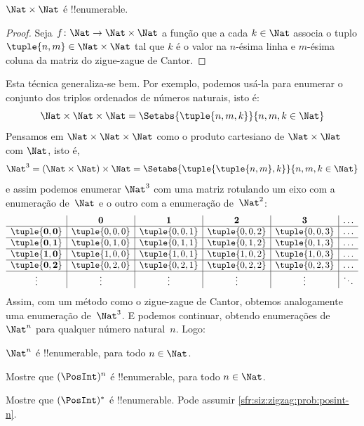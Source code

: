 \documentclass[../../../include/open-logic-section]{subfiles}
\begin{document}
\begin{prop}
$\Nat \times \Nat$ é !!{enumerable}.
\end{prop}

\begin{proof}
Seja $f \colon \Nat \to \Nat\times\Nat$ a função que a cada $k \in \Nat$ associa o
tuplo $\tuple{n,m} \in \Nat \times \Nat$ tal que $k$ é o valor na $n$-ésima
linha e $m$-ésima coluna da matriz do zigue-zague de Cantor.
\end{proof}

\begin{explain}
Esta técnica generaliza-se bem. Por exemplo, podemos usá-la para enumerar o
conjunto dos triplos ordenados de números naturais, isto é:
\[
\Nat \times \Nat \times \Nat = \Setabs{\tuple{n,m,k}}{n,m,k \in \Nat}
\]
Pensamos em $\Nat \times \Nat \times \Nat$ como o produto cartesiano de $\Nat
\times \Nat$ com $\Nat$, isto é,
\[
\Nat^3 = (\Nat \times \Nat) \times \Nat =
\Setabs{\tuple{\tuple{n,m},k}}{n, m, k
  \in \Nat }
\]
e assim podemos enumerar $\Nat^3$ com uma matriz rotulando um eixo com a
enumeração de~$\Nat$ e o outro com a enumeração de~$\Nat^2$:
\[
\begin{array}{ c | c | c | c | c | c}
& \mathbf 0 & \mathbf 1 & \mathbf 2 & \mathbf 3 & \dots \\
\hline
\mathbf{\tuple{0,0}} & \tuple{0,0,0} & \tuple{0,0,1} & \tuple{0,0,2} & \tuple{0,0,3} & \dots \\
\hline
\mathbf{\tuple{0,1}} & \tuple{0,1,0} & \tuple{0,1,1} & \tuple{0,1,2} & \tuple{0,1,3} & \dots \\
\hline
\mathbf{\tuple{1,0}} & \tuple{1,0,0} & \tuple{1,0,1} & \tuple{1,0,2} & \tuple{1,0,3} & \dots \\
\hline
\mathbf{\tuple{0,2}} & \tuple{0,2,0} & \tuple{0,2,1} & \tuple{0,2,2} & \tuple{0,2,3} & \dots\\
\hline
\vdots & \vdots & \vdots & \vdots & \vdots & \ddots \\
\end{array}
\]
Assim, com um método como o zigue-zague de Cantor, obtemos analogamente uma
enumeração de~$\Nat^3$. E podemos continuar, obtendo enumerações de $\Nat^n$ para
qualquer número natural~$n$. Logo:
\end{explain}

\begin{prop}
$\Nat^n$ é !!{enumerable}, para todo $n \in \Nat$.
\end{prop}

\begin{prob}\label{sfr:siz:zigzag:prob:posint-n}
Mostre que $(\PosInt)^n$ é !!{enumerable}, para todo $n \in \Nat$.
\end{prob}

\begin{prob}\label{sfr:siz:zigzag:prob:posint-star}
  Mostre que $(\PosInt)^*$ é !!{enumerable}. Pode assumir \cref{sfr:siz:zigzag:prob:posint-n}.
\end{prob}
\end{document}
